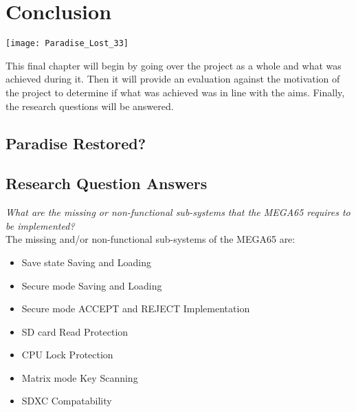 
\chapter{Conclusion} %

\texttt{[image: Paradise\_Lost\_33]}

\label{Chapter 8} %

This final chapter will begin by going over the project as a whole and what was achieved during it. Then it will provide an evaluation against the motivation of the project to determine if what was achieved was in line with the aims. Finally, the research questions will be answered.


\section{Paradise Restored?}

\label{Ch8 Sec1}


\section{Research Question Answers}

\label{Ch9 Sec2}

\textit{What are the missing or non-functional sub-systems that the MEGA65 requires to be implemented?}\\
The missing and/or non-functional sub-systems of the MEGA65 are:
\begin{itemize}
\item{Save state Saving and Loading}
\item{Secure mode Saving and Loading}
\item{Secure mode ACCEPT and REJECT Implementation}
\item{SD card Read Protection}
\item{CPU Lock Protection}
\item{Matrix mode Key Scanning}
\item{SDXC Compatability}
\end{itemize}

